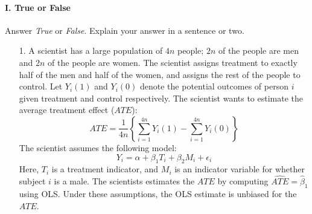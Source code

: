 \documentclass{article}
\newcommand{\E}[0]{\mathbb{E}}
\begin{document}
\paragraph{\Large I. True or False}
Answer {\em True} or {\em False}.  Explain your answer in a sentence or two.
\begin{itemize}


\item[1.]   
      A scientist has a large population of $4n$ people;
      $2n$ of the people are men and $2n$ of the people are women.
      The scientist assigns treatment to exactly half of the men and half of the women,
      and assigns the rest of the people to control.
      Let $Y_i(1)$ and $Y_i(0)$ denote the potential outcomes
      of person $i$ given treatment and control respectively.
      The scientist wants to estimate the average treatment effect ($ATE$):
      $$
        ATE = \frac{1}{4n}\left\{\sum_{i=1}^{4n}Y_i(1) - \sum_{i=1}^{4n} Y_i(0)\right\}
      $$
      The scientist assumes the following model:
      $$
        Y_i = \alpha + \beta_1 T_i + \beta_2 M_i + \epsilon_i
      $$
      Here, $T_i$ is a treatment indicator, and
      $M_i$ is an indicator variable for whether
      subject $i$ is a male.
      The scientists estimates the $ATE$ by computing $\widehat{ATE} = \hat\beta_1$ 
      using OLS. 
      Under these assumptions, the OLS estimate is unbiased for the $ATE$.



\end{itemize}
\end{document}
